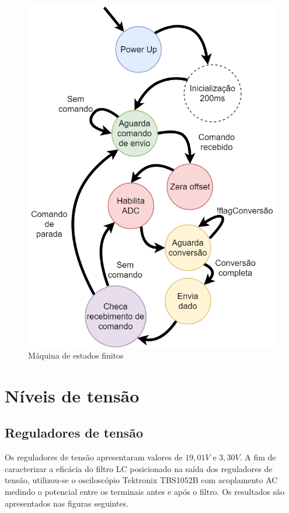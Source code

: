 \documentclass[
	12pt,				%
	openright,			%
	twoside,			%
	a4paper,			%
	english,			%
	french,				%
	spanish,			%
	brazil,				%
	]{abntex2}
\begin{document}
	\begin{figure}[!ht]
		\centering
		\includegraphics[scale = .47]{../Fotos/diagramaTelemetria.png}
		\caption{Máquina de estados finitos}
	\end{figure}

	\section{Níveis de tensão}
		\subsection{Reguladores de tensão}
			Os reguladores de tensão apresentaram valores de $19,01V$ e
			$3,30V$. A fim de caracterizar a eficácia do filtro LC
			posicionado na saída dos reguladores de tensão, utilizou-se o
			osciloscópio Tektronix TBS1052B com acoplamento AC medindo o
			potencial entre os terminais antes e após o filtro. Os
			resultados são apresentados nas figuras seguintes.
\end{document}
